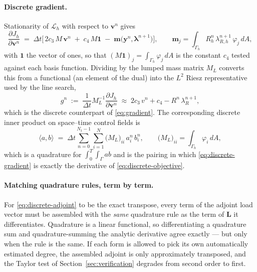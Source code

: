 \documentclass[11pt]{article}
\newcommand{\Lag}{\mathcal{L}}
\begin{document}
\paragraph{Discrete gradient.} Stationarity of $\Lag_h$ with respect to $\mathbf{v}^n$ gives
\begin{equation}
\frac{\partial J_h}{\partial \mathbf{v}^n} \;=\; \Delta t\Big[\,2c_3\,M\,\mathbf{v}^n \;+\; c_4\,M\mathbf{1} \;-\; \mathbf{m}\big(\mathbf{y}^n,\boldsymbol\lambda^{n+1}\big)\Big],
\qquad
\mathbf{m}_j = \int_{\Gamma_h} R_h^n\,\lambda_{R,h}^{n+1}\,\varphi_j\,dA ,
\label{eq:discrete-gradient}
\end{equation}
with $\mathbf{1}$ the vector of ones, so that $(M\mathbf{1})_j = \int_{\Gamma_h}\varphi_j\,dA$ is the constant $c_4$ tested against each basis function. Dividing by the lumped mass matrix $M_L$ converts this from a functional (an element of the dual) into the $L^2$ Riesz representative used by the line search,
\begin{equation}
g^n \;:=\; \frac{1}{\Delta t}M_L^{-1}\frac{\partial J_h}{\partial\mathbf{v}^n}
\;\approx\; 2c_3\,v^n + c_4 - R^n\,\lambda_R^{n+1},
\end{equation}
which is the discrete counterpart of \eqref{eq:gradient}. The corresponding discrete inner product on space--time control fields is
\begin{equation}
\big\langle a, b\big\rangle \;=\; \Delta t\sum_{n=0}^{N_t-1}\sum_{i=1}^{N} \big(M_L\big)_{ii}\,a^n_i\,b^n_i,
\qquad \big(M_L\big)_{ii} = \int_{\Gamma_h}\varphi_i\,dA,
\label{eq:inner-product}
\end{equation}
which is a quadrature for $\int_0^T\int_\Gamma ab$ and is the pairing in which \eqref{eq:discrete-gradient} is exactly the derivative of \eqref{eq:discrete-objective}.

\paragraph{Matching quadrature rules, term by term.} For \eqref{eq:discrete-adjoint} to be the exact transpose, every term of the adjoint load vector must be assembled with the \emph{same} quadrature rule as the term of $\mathbf{L}$ it differentiates. Quadrature is a linear functional, so differentiating a quadrature sum and quadrature-summing the analytic derivative agree exactly --- but only when the rule is the same. If each form is allowed to pick its own automatically estimated degree, the assembled adjoint is only approximately transposed, and the Taylor test of Section~\ref{sec:verification} degrades from second order to first.
\end{document}

